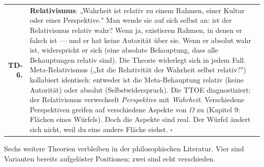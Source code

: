 \documentclass[10pt, openany, oneside]{book}
\begin{document}
{\begin{tabular}{r p{}}
\textbf{TD-6.} & \textbf{Relativismus}: „Wahrheit ist relativ zu einem Rahmen, einer Kultur oder einer Perspektive." Man wende sie auf sich selbst an: ist der Relativismus relativ wahr? Wenn ja, existieren Rahmen, in denen er falsch ist --- und er hat keine Autorität über sie. Wenn er absolut wahr ist, widerspricht er sich (eine absolute Behauptung, dass alle Behauptungen relativ sind). Die Theorie widerlegt sich in jedem Fall. Meta-Relativismus („Ist die Relativität der Wahrheit selbst relativ?") kollabiert identisch: entweder ist die Meta-Behauptung relativ (keine Autorität) oder absolut (Selbstwiderspruch). Die TTOE diagnostiziert: der Relativismus verwechselt \textit{Perspektive} mit \textit{Wahrheit}. Verschiedene Perspektiven greifen auf verschiedene Aspekte von $\Omega$ zu (Kapitel 9: Flächen eines Würfels). Doch die Aspekte sind real. Der Würfel ändert sich nicht, weil du eine andere Fläche siehst. $\square$ \\[0.3em]
\end{tabular}
}

\vspace{0.8em}

\noindent Sechs weitere Theorien verbleiben in der philosophischen Literatur. Vier sind Varianten bereits aufgelöster Positionen; zwei sind echt verschieden.
\end{document}
